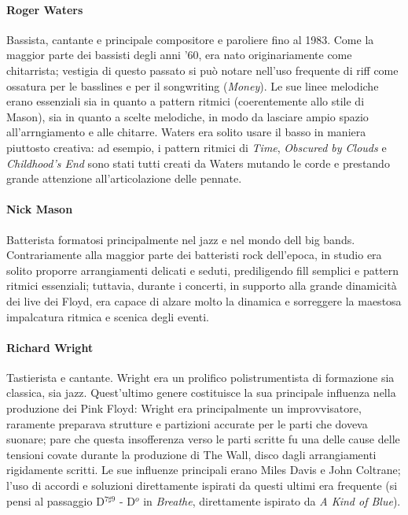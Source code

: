 \documentclass[class=book, crop=false, oneside, 12pt]{standalone}
\begin{document}
    \paragraph{Roger Waters}
    Bassista, cantante e principale compositore e paroliere fino al 1983. Come la maggior parte dei bassisti degli anni '60, era nato originariamente come chitarrista; vestigia di questo passato si può notare nell'uso frequente di riff come ossatura per le basslines e per il songwriting (\emph{Money}). Le sue linee melodiche erano essenziali sia in quanto a pattern ritmici (coerentemente allo stile di Mason), sia in quanto a scelte melodiche, in modo da lasciare ampio spazio all'arrngiamento e alle chitarre. Waters era solito usare il basso in maniera piuttosto creativa: ad esempio, i pattern ritmici di \emph{Time}, \emph{Obscured by Clouds} e \emph{Childhood's End} sono stati tutti creati da Waters mutando le corde e prestando grande attenzione all'articolazione delle pennate.
    \paragraph{Nick Mason}
    Batterista formatosi principalmente nel jazz e nel mondo dell big bands. Contrariamente alla maggior parte dei batteristi rock dell'epoca, in studio era solito proporre arrangiamenti delicati e seduti, prediligendo fill semplici e pattern ritmici essenziali; tuttavia, durante i concerti, in supporto alla grande dinamicità dei live dei Floyd, era capace di alzare molto la dinamica e sorreggere la maestosa impalcatura ritmica e scenica degli eventi.
    \paragraph{Richard Wright}
    Tastierista e cantante. Wright era un prolifico polistrumentista di formazione sia classica, sia jazz. Quest'ultimo genere costituisce la sua principale influenza nella produzione dei Pink Floyd: Wright era principalmente un improvvisatore, raramente preparava strutture e partizioni accurate per le parti che doveva suonare; pare che questa insofferenza verso le parti scritte fu una delle cause delle tensioni covate durante la produzione di The Wall, disco dagli arrangiamenti rigidamente scritti. Le sue influenze principali erano Miles Davis e John Coltrane; l'uso di accordi e soluzioni direttamente ispirati da questi ultimi era frequente (si pensi al passaggio D\(^{7 \sharp 9}\) - D\(^o\) in \emph{Breathe}, direttamente ispirato da \emph{A Kind of Blue}). 
\end{document}
